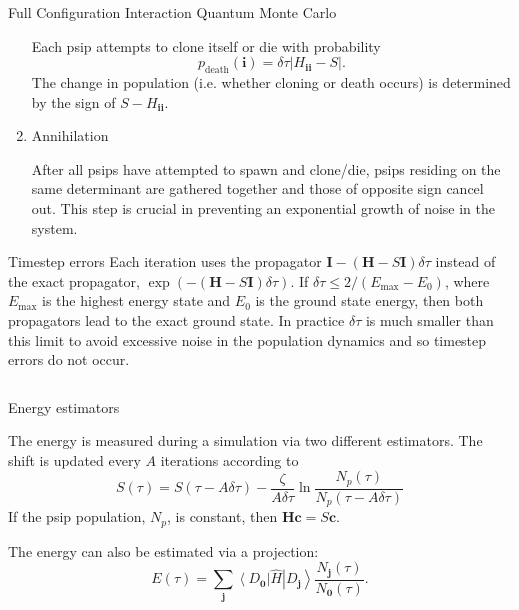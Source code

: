 \documentclass[final]{beamer} %
\newcommand{\ket}[1]{\left\vert#1\right\rangle}
\newcommand{\bra}[1]{\left\langle#1\right\vert}
\newcommand{\abs}[1]{\left\vert#1\right\vert}
\newcommand{\Hamil}{\hat{H}}
\newcommand{\dt}{\delta\tau}
\newcommand{\Emax}{E_{\textrm{max}}}
\newcommand{\bz}{\mathbf{0}}
\newcommand{\bi}{\mathbf{i}}
\newcommand{\bj}{\mathbf{j}}
\newcommand{\cc}{\mathbf{c}}
\newcommand{\HH}{\mathbf{H}}
\newcommand{\II}{\mathbf{I}}
\begin{document}
\begin{frame}[t]
\begin{columns}[t]
\begin{column}{0.9\paperwidth}
\begin{block}{Full Configuration Interaction Quantum Monte Carlo}
\begin{multicols}{3}
\begin{enumerate}
           Each psip attempts to clone itself or die with probability
           \begin{equation}
               p_{\textrm{death}}(\bi) = \dt\abs{H_{\bi\bi}-S}.
           \end{equation}
           The change in population (i.e. whether cloning or death occurs) is determined by the sign of $S-H_{\bi\bi}$.
           \item Annihilation

           After all psips have attempted to spawn and clone/die, psips residing on the same determinant are gathered together and those of opposite sign cancel out.  This step is crucial in preventing an exponential growth of noise in the system.
           \end{enumerate}
           \begin{center}
           \begin{minipage}{\columnwidth}
           \begin{block}{Timestep errors}
               Each iteration uses the propagator $\II - (\HH - S\II)\dt$ instead of the exact propagator, $\exp(-(\HH - S\II)\dt)$.  If \mbox{$\dt \leq 2/(\Emax - E_0)$}, where $\Emax$ is the highest energy state and $E_0$ is the ground state energy, then both propagators lead to the exact ground state.  In practice $\dt$ is much smaller than this limit to avoid excessive noise in the population dynamics and so timestep errors do not occur.
           \end{block}
           \end{minipage}
           \end{center}
       \end{multicols}
%
       \begin{columns}[t]
           \begin{column}{0.74\paperwidth}
               \begin{alertblock}{Energy estimators}
               \begin{multicols}{2}
               The energy is measured during a simulation via two different estimators.  The shift is updated every $A$ iterations according to
               \begin{equation}
                   S(\tau) = S(\tau - A\dt) - \frac{\zeta}{A\dt}\ln\frac{N_p(\tau)}{N_p(\tau-A\dt)}
               \end{equation}
               If the psip population, $N_p$, is constant, then $\HH\cc = S\cc$.

               The energy can also be estimated via a projection:
               \begin{equation}
                  E(\tau) = \sum_\bj \bra{D_\bz}\Hamil\ket{D_\bj} \frac{N_\bj(\tau)}{N_\bz(\tau)}.
               \end{equation}


\end{multicols}
\end{alertblock}
\end{column}
\end{columns}
\end{block}
\end{column}
\end{columns}
\end{frame}
\end{document}
